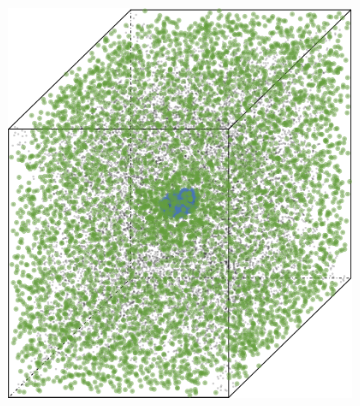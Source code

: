 	\begin{figure}[b!]
		\centering
		\begin{subfigure}{0.23\textwidth}
			\centering
			\includegraphics[keepaspectratio=true, width=\textwidth, height=0.23\textheight]{discussion/img/anisotropy_1_60000_anisotropy.png}
			\caption{\anisotropyOne}
			\label{fig:discussion:anisotropy:anisotropy1}
		\end{subfigure}
		\begin{subfigure}{0.23\textwidth}
			\centering

\end{subfigure}
\end{figure}
